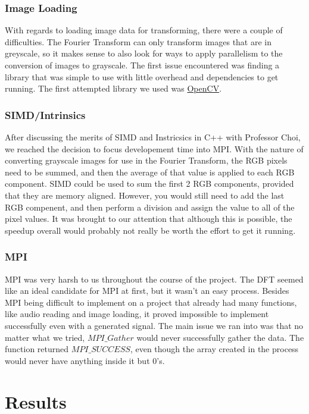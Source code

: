 \documentclass[12pt]{extarticle}
\begin{document}
	\subsubsection*{Image Loading}
	With regards to loading image data for transforming, there were a couple of difficulties. The Fourier Transform can only transform images
	that are in greyscale, so it makes sense to also look for ways to apply parallelism to the conversion of images to grayscale.
	The first issue encountered was finding a library that was simple to use with little overhead and dependencies to get running. 
	The first attempted library we used was \href{https://opencv.org/}{OpenCV}.
	
	\subsubsection*{SIMD/Intrinsics}
	After discussing the merits of SIMD and Instricsics in C++ with Professor Choi, we reached the decision to focus developement time into
	MPI. With the nature of converting grayscale images for use in the Fourier Transform, the RGB pixels need to be summed, and then the average
	of that value is applied to each RGB component. SIMD could be used to sum the first 2 RGB components, provided that they are memory aligned. 
	However, you would still need to add the last RGB compenent, and then perform a division and assign the value to all of the pixel values.
	It was brought to our attention that although this is possible, the speedup overall would probably not really be worth the effort to get it
	running.

	\subsubsection*{MPI}
		MPI was very harsh to us throughout the course of the project.
		The DFT seemed like an ideal candidate for MPI at first, but it wasn't an easy process.
		Besides MPI being difficult to implement on a project that already had many functions, like audio reading and image loading, it proved impossible to implement successfully even with a generated signal.
		The main issue we ran into was that no matter what we tried, $MPI\_Gather$ would never successfully gather the data.
		The function returned $MPI\_SUCCESS$, even though the array created in the process would never have anything inside it but 0's.

\section*{Results}
\end{document}
